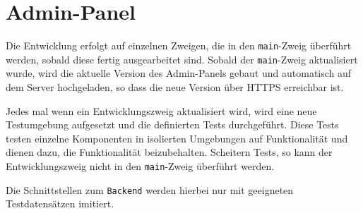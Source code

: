 \section{Admin-Panel}\label{CICD_Admin_Panel}

Die Entwicklung erfolgt auf einzelnen Zweigen, die in den \verb#main#-Zweig überführt werden, sobald diese fertig ausgearbeitet sind.
Sobald der \verb#main#-Zweig aktualisiert wurde, wird die aktuelle Version des Admin-Panels gebaut und automatisch auf dem Server hochgeladen,
so dass die neue Version über HTTPS erreichbar ist.

Jedes mal wenn ein Entwicklungszweig aktualisiert wird, wird eine neue Testumgebung aufgesetzt und die definierten Tests durchgeführt.
Diese Tests testen einzelne Komponenten in isolierten Umgebungen auf Funktionalität und dienen dazu, die Funktionalität beizubehalten.
Scheitern Tests, so kann der Entwicklungszweig nicht in den \verb#main#-Zweig überführt werden.

Die Schnittstellen zum \verb#Backend# werden hierbei nur mit geeigneten Testdatensätzen imitiert.